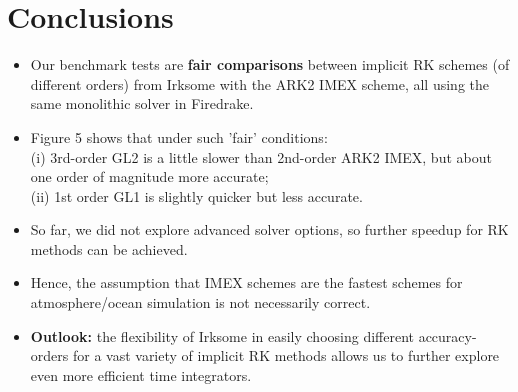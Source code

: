 \documentclass[a4paper, 12pt]{article}
\begin{document}
%
%
%
%
%





 \cleardoublepage


\section{Conclusions}

   \begin{itemize}
    \item Our benchmark tests are \textbf{fair comparisons} between implicit RK schemes (of different orders) from Irksome with the ARK2 IMEX scheme, all using the same monolithic solver in Firedrake.

   \item Figure 5 shows that under such 'fair' conditions:\\
   (i) 3rd-order GL2 is a little slower than 2nd-order ARK2 IMEX, but about one order of magnitude more accurate; \\
   (ii) 1st order GL1 is slightly quicker but less accurate.

  \item So far, we did not explore advanced solver options, so further speedup for RK methods can be achieved.


   \item Hence, the assumption that IMEX schemes are the fastest schemes for atmosphere/ocean simulation is not necessarily correct.

   \item \textbf{Outlook:} the flexibility of Irksome in easily choosing different accuracy-orders for a vast variety of implicit RK methods allows us to further explore even more efficient time integrators.
   \end{itemize}
\end{document}
